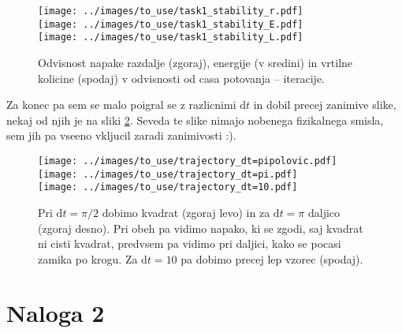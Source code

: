 \documentclass[11pt, a4paper]{article}
\begin{document}
    \begin{figure}[H]
        \centering
        \texttt{[image: ../images/to\_use/task1\_stability\_r.pdf]}\\
        \texttt{[image: ../images/to\_use/task1\_stability\_E.pdf]}\\
        \texttt{[image: ../images/to\_use/task1\_stability\_L.pdf]}
        \caption{Odvisnost napake razdalje (zgoraj), energije (v sredini) in vrtilne kolicine (spodaj) v odvisnosti od casa
        potovanja -- iteracije.}
        \label{fig:task1_stabilities}
    \end{figure}

    Za konec pa sem se malo poigral se z razlicnimi $\text{d}t$ in dobil precej zanimive slike, nekaj od njih je na sliki
    \ref{fig:task1_interesting}. Seveda te slike nimajo nobenega fizikalnega smisla, sem jih pa vseeno vkljucil zaradi zanimivosti :).

    \begin{figure}[H]
        \centering
        \texttt{[image: ../images/to\_use/trajectory\_dt=pipolovic.pdf]}
        \texttt{[image: ../images/to\_use/trajectory\_dt=pi.pdf]}\\
        \texttt{[image: ../images/to\_use/trajectory\_dt=10.pdf]}
        \caption{Pri $\text{d}t = \pi/2$ dobimo kvadrat (zgoraj levo) in za $\text{d}t = \pi$ daljico (zgoraj desno).
        Pri obeh pa vidimo napako, ki se zgodi, saj kvadrat ni cisti kvadrat, predvsem pa vidimo pri daljici, kako se pocasi zamika po krogu.
        Za $\text{d}t = 10$ pa dobimo precej lep vzorec (spodaj).}
        \label{fig:task1_interesting}
    \end{figure}

    \section*{Naloga 2}
\end{document}
